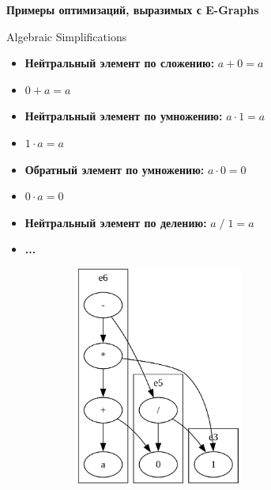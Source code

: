 \documentclass[aspectratio=169
  , xcolor={svgnames}
  , russian  %
  ]{beamer}
\begin{document}
\begin{frame}{}
    \centering
    \textbf{\Huge Примеры оптимизаций, выразимых с E-Graphs} \\
    \vspace{1cm}
\end{frame}

\begin{frame}{Algebraic Simplifications}
    \begin{itemize}
    \item \textbf{\fontsize{14.1}{12} Нейтральный элемент по сложению:} \textbf{\fontsize{14.1}{12} $a + 0 = a$}
    \item \textbf{\fontsize{14.1}{12} $0 + a = a$}
    \newline
    \item \textbf{\fontsize{14.1}{12} Нейтральный элемент по умножению:} \textbf{\fontsize{14.1}{12} $a \cdot 1 = a$}
    \item \textbf{\fontsize{14.1}{12} $1 \cdot a = a$}
    \newline
    \item \textbf{\fontsize{14.1}{12} Обратный элемент по умножению:} \textbf{\fontsize{14.1}{12} $a \cdot 0 = 0$}
    \item \textbf{\fontsize{14.1}{12} $0 \cdot a = 0$}
    \newline
    \item \textbf{\fontsize{14.1}{12} Нейтральный элемент по делению:} \textbf{\fontsize{14.1}{12} $a \; / \; 1 = a$}
    \newline
    \item \textbf{\fontsize{14.1}{12} ...}
\end{itemize}
\end{frame}

\begin{frame}{}
    \centering
    \includegraphics[width=10.2cm, height=7.2cm]{misc/egraphs_images/algebraic_simpl_demo.jpeg}
\end{frame}
\end{document}
